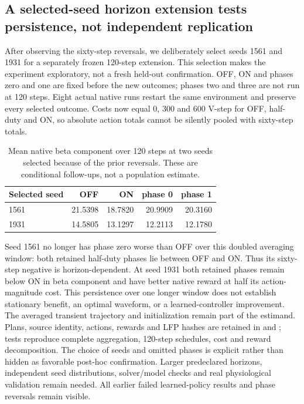 \subsection{A selected-seed horizon extension tests persistence, not independent replication}
After observing the sixty-step reversals, we deliberately select seeds 1561 and 1931 for a separately frozen 120-step extension. This selection makes the experiment exploratory, not a fresh held-out confirmation. OFF, ON and phases zero and one are fixed before the new outcomes; phases two and three are not run at 120 steps. Eight actual native runs restart the same environment and preserve every selected outcome. Costs now equal 0, 300 and 600 V-step for OFF, half-duty and ON, so absolute action totals cannot be silently pooled with sixty-step totals.
\begin{table}[ht]\centering
\caption{Mean native beta component over 120 steps at two seeds selected because of the prior reversals. These are conditional follow-ups, not a population estimate.}
\begin{tabular}{lrrrr}\hline
Selected seed & OFF & ON & phase 0 & phase 1\\\hline
1561 &21.5398&18.7820&20.9909&20.3160\\
1931 &14.5805&13.1297&12.2113&12.1780\\\hline
\end{tabular}\end{table}
Seed 1561 no longer has phase zero worse than OFF over this doubled averaging window: both retained half-duty phases lie between OFF and ON. Thus its sixty-step negative is horizon-dependent. At seed 1931 both retained phases remain below ON in beta component and have better native reward at half its action-magnitude cost. This persistence over one longer window does not establish stationary benefit, an optimal waveform, or a learned-controller improvement. The averaged transient trajectory and initialization remain part of the estimand.
Plans, source identity, actions, rewards and LFP hashes are retained in  and ; tests reproduce complete aggregation, 120-step schedules, cost and reward decomposition. The choice of seeds and omitted phases is explicit rather than hidden as favorable post-hoc confirmation. Larger predeclared horizons, independent seed distributions, solver/model checks and real physiological validation remain needed. All earlier failed learned-policy results and phase reversals remain visible.

